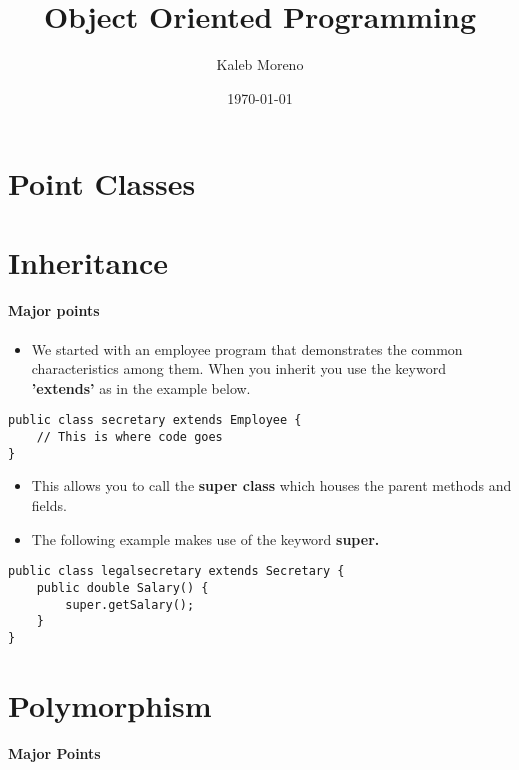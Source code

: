 \documentclass{article}
\begin{document}
\title{Object Oriented Programming}
\author{Kaleb Moreno}
\date{\today}
\maketitle
\pagebreak
\tableofcontents
\pagebreak

\section{Point Classes}
\section{Inheritance}
\paragraph{Major points}

\begin{itemize}
  \item We started with an employee program that demonstrates the common
  characteristics among them. When you inherit you use the keyword
  \textbf{'extends'} as in the example below.
\end{itemize}

\begin{lstlisting}
public class secretary extends Employee {
	// This is where code goes
}
\end{lstlisting}

\begin{itemize}
  \item This allows you to call the \textbf{super class} which houses the parent
  methods and fields.
  \item The following example makes use of the keyword \textbf{super.}
\end{itemize}

\begin{lstlisting}
public class legalsecretary extends Secretary {
	public double Salary() {
		super.getSalary();
	}
}
\end{lstlisting}

\section{Polymorphism}
\paragraph{Major Points}
\end{document}

